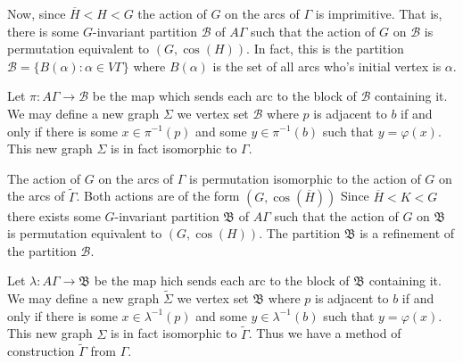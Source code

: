\documentclass[12pt]{amsart}
\theoremstyle{plain}
\theoremstyle{definition}
\theoremstyle{remark}
\newcommand{\cB}{\mathcal{B}}
\begin{document}
Now, since $\overline{H} < H < G$ the action of $G$
on the arcs of $\Gamma$ is imprimitive.
That is, there is some $G$-invariant partition $\cB$
of $A \Gamma$ such that the action of $G$ on $\cB$
is permutation equivalent to $(G, \cos(H))$.
In fact, this is the partition $\cB = \{ B(\alpha) : \alpha \in V \Gamma \}$
where $B(\alpha)$ is the set of all arcs who's initial vertex is $\alpha$.

Let $\pi : A \Gamma \to \cB$ be the map which sends
each arc to the block of $\cB$ containing it.
We may define a new graph $\Sigma$ we vertex set
$\cB$ where $p$ is adjacent to $b$ if and only if
there is some $x \in \pi^{-1}(p)$ and some $y \in \pi^{-1}(b)$
such that $y = \varphi(x)$.
This new graph $\Sigma$ is in fact isomorphic to $\Gamma$.

The action of $G$ on the arcs of $\Gamma$ is permutation
isomorphic to the action of $G$ on the arcs of $\widetilde{\Gamma}$.
Both actions are of the form $(G, \cos(\overline{H}))$
Since $\overline{H} < K < G$ there exists some $G$-invariant partition
$\mathfrak{B}$ of $A \Gamma$ such that the action of $G$ on $\mathfrak{B}$
is permutation equivalent to $(G, \cos(H))$.
The partition $\mathfrak{B}$ is a refinement of the partition $\cB$.

Let $\lambda : A \Gamma \to \mathfrak{B}$ be the map hich sends
each arc to the block of $\mathfrak{B}$ containing it.
We may define a new graph $\widetilde{\Sigma}$ we vertex set
$\mathfrak{B}$ where $p$ is adjacent to $b$ if and only if
there is some $x \in \lambda^{-1}(p)$ and some $y \in \lambda^{-1}(b)$
such that $y = \varphi(x)$.
This new graph $\Sigma$ is in fact isomorphic to $\widetilde{\Gamma}$.
Thus we have a method of construction $\widetilde{\Gamma}$ from $\Gamma$.
\end{document}

